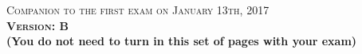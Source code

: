 \documentclass{docist}
\begin{document}
\thispagestyle{empty}

\begin{center}
  {\Large \textsc{Companion to the first exam on January 13th, 2017\\[2ex]
  \textbf{Version: B}\\[2ex]}}
  {\normalsize  \textbf{(You do not need to turn in this set of pages with your exam)}}
\end{center}





\qAvailabilityINGLES



\qPeerToPeerDynamicReconfiguration



\qPipeFilterComposition



\qSOAINGLES



\qWhiteBoxTestingINGLES



\qArqChrome



\qSoftwareArchitectureOne



\qRequirementsImpact



\qAvailabilityScenarioOne



\qAvailabilityVotingEN



\qMWResourceLoaderTacticEEEN



\qPerfomanceTacticOne



\qScalabilityINGLES



\qLayersTactics



\qAdventureBuilderThree


\end{document}
